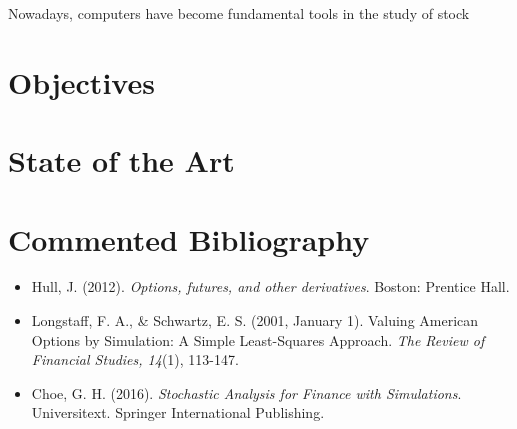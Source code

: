 \documentclass[a4paper,prd,twocolumn,nofootinbib,superscriptaddress,floatfix]{revtex4}
\begin{document}
Nowadays, computers have become fundamental tools in the study of stock

\section{Objectives}

\section{State of the Art}

\section{Commented Bibliography}
\begin{itemize}
\item Hull, J. (2012). \textit{Options, futures, and other derivatives}. Boston: Prentice Hall.

\item Longstaff, F. A., \& Schwartz, E. S. (2001, January 1). Valuing American Options by Simulation: A Simple Least-Squares Approach. \textit{The Review of Financial Studies, 14}(1), 113-147.

\item Choe, G. H. (2016). \textit{Stochastic Analysis for Finance with Simulations}. Universitext. Springer International Publishing. 
\end{itemize}
\end{document}
